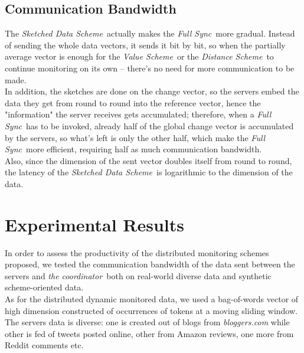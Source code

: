 \documentclass[10pt, conference]{IEEEtran}
\newcommand{\valueScheme}{\textit{Value Scheme}}
\newcommand{\distanceScheme}{\textit{Distance Scheme}}
\newcommand{\sketchScheme}{\textit{Sketched Data Scheme}}
\newcommand{\fullSync}{\textit{Full Sync}}
\newcommand{\theCoordinator}{\textit{the coordinator}}
\begin{document}
\subsection{Communication Bandwidth}
The \sketchScheme \ actually makes the \fullSync \ more gradual. Instead of sending the whole data vectors, it sends it bit by bit, so when the partially average vector is enough for the \valueScheme \ or the \distanceScheme \ to continue monitoring on its own -- there's no need for more communication to be made. \\
In addition, the sketches are done on the change vector, so the servers embed the data they get from round to round into the reference vector, hence the "information" the server receives gets accumulated; therefore, when a \fullSync \ has to be invoked, already half of the global change vector is accumulated by the servers, so what's left is only the other half, which make the \fullSync \ more efficient, requiring half as much communication bandwidth. \\
Also, since the dimension of the sent vector doubles itself from round to round, the latency of the \sketchScheme \ is logarithmic to the dimension of the data.  

\section{Experimental Results}
In order to assess the productivity of the distributed monitoring schemes proposed, we tested the communication bandwidth of the data sent between the servers and \theCoordinator \ both on real-world diverse data and synthetic scheme-oriented data. \\
As for the distributed dynamic monitored data, we used a bag-of-words vector of high dimension constructed of occurrences of tokens at a moving sliding window. \\
The servers data is diverse: one is created out of blogs from \textit{bloggers.com} while other is fed of tweets posted online, other from Amazon reviews, one more from Reddit comments etc.
\end{document}
